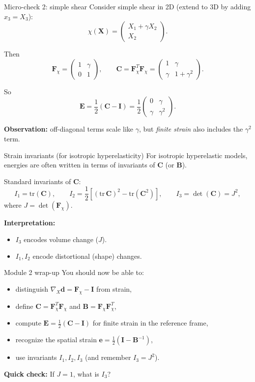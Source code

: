 \documentclass[aspectratio=169]{beamer}
\newcommand{\X}{\bm{X}}
\newcommand{\I}{\bm{I}}
\newcommand{\gradX}{\nabla_{\!X}}
\newcommand{\Cten}{\bm{C}}     %
\newcommand{\Bten}{\bm{B}}     %
\newcommand{\Eten}{\bm{E}}     %
\newcommand{\eten}{\bm{e}}     %
\newcommand{\Fdef}{\bm{F}_{\chi}}  %
\begin{document}
\begin{frame}{Micro-check 2: simple shear}
\small
Consider simple shear in 2D (extend to 3D by adding \(x_3=X_3\)):
\[
\chi(\X) = \begin{pmatrix} X_1+\gamma X_2 \\ X_2 \end{pmatrix}.
\]

Then
\[
\Fdef=
\begin{pmatrix}
1 & \gamma \\
0 & 1
\end{pmatrix},
\qquad
\Cten=\Fdef^T\Fdef=
\begin{pmatrix}
1 & \gamma \\
\gamma & 1+\gamma^2
\end{pmatrix}.
\]

So
\[
\Eten=\frac12(\Cten-\I)=\frac12
\begin{pmatrix}
0 & \gamma \\
\gamma & \gamma^2
\end{pmatrix}.
\]

\medskip
\textbf{Observation:} off-diagonal terms scale like \(\gamma\), but \emph{finite strain} also includes the \(\gamma^2\) term.

\end{frame}

\begin{frame}{Strain invariants (for isotropic hyperelasticity)}
\small
For isotropic hyperelastic models, energies are often written in terms of invariants of \(\Cten\) (or \(\Bten\)).

\medskip
Standard invariants of \(\Cten\):
\[
I_1 = \mathrm{tr}(\Cten), \qquad
I_2 = \frac12\left[(\mathrm{tr}\,\Cten)^2 - \mathrm{tr}(\Cten^2)\right], \qquad
I_3 = \det(\Cten)=J^2,
\]
where \(J=\det(\Fdef)\).

\medskip
\textbf{Interpretation:}
\begin{itemize}
\item \(I_3\) encodes volume change (\(J\)).
\item \(I_1, I_2\) encode distortional (shape) changes.
\end{itemize}


\end{frame}

\begin{frame}{Module 2 wrap-up}
\small
You should now be able to:
\begin{itemize}
\item distinguish \(\gradX\bm{d}=\Fdef-\I\) from strain,
\item define \(\Cten=\Fdef^T\Fdef\) and \(\Bten=\Fdef\Fdef^T\),
\item compute \(\Eten=\tfrac12(\Cten-\I)\) for finite strain in the reference frame,
\item recognize the spatial strain \(\eten=\tfrac12(\I-\Bten^{-1})\),
\item use invariants \(I_1,I_2,I_3\) (and remember \(I_3=J^2\)).
\end{itemize}

\medskip
\textbf{Quick check:} If \(J=1\), what is \(I_3\)?
\end{frame}
\end{document}
